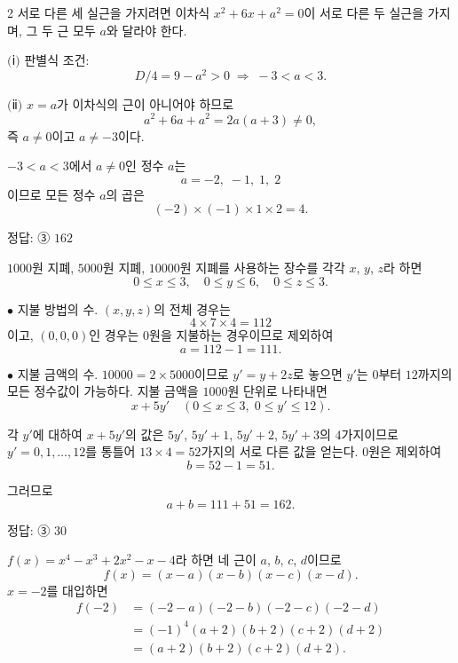 \documentclass[10pt]{article}
\begin{document}
\begin{multicols}{2}
서로 다른 세 실근을 가지려면 이차식 $x^2 + 6x + a^2 = 0$이 서로 다른 두 실근을 가지며, 그 두 근 모두 $a$와 달라야 한다.

$(\!$ⅰ$)$ 판별식 조건:
\[ D/4 = 9 - a^2 > 0 \;\Rightarrow\; -3 < a < 3. \]

$(\!$ⅱ$)$ $x = a$가 이차식의 근이 아니어야 하므로
\[ a^2 + 6a + a^2 = 2a(a+3) \ne 0, \]
즉 $a \ne 0$이고 $a \ne -3$이다.

$-3 < a < 3$에서 $a \ne 0$인 정수 $a$는
\[ a = -2,\; -1,\; 1,\; 2 \]
이므로 모든 정수 $a$의 곱은
\[ (-2) \times (-1) \times 1 \times 2 = 4. \]

\begin{answerbox}정답: ③ $162$\end{answerbox}

$1000$원 지폐, $5000$원 지폐, $10000$원 지폐를 사용하는 장수를 각각 $x$, $y$, $z$라 하면
\[ 0 \le x \le 3,\quad 0 \le y \le 6,\quad 0 \le z \le 3. \]

$\bullet$ 지불 방법의 수. $(x, y, z)$의 전체 경우는
\[ 4 \times 7 \times 4 = 112 \]
이고, $(0, 0, 0)$인 경우는 $0$원을 지불하는 경우이므로 제외하여
\[ a = 112 - 1 = 111. \]

$\bullet$ 지불 금액의 수. $10000 = 2 \times 5000$이므로 $y' = y + 2z$로 놓으면 $y'$는 $0$부터 $12$까지의 모든 정수값이 가능하다. 지불 금액을 $1000$원 단위로 나타내면
\[ x + 5y' \quad (0 \le x \le 3,\; 0 \le y' \le 12). \]

각 $y'$에 대하여 $x + 5y'$의 값은 $5y'$, $5y'+1$, $5y'+2$, $5y'+3$의 $4$가지이므로 $y' = 0, 1, \ldots, 12$를 통틀어 $13 \times 4 = 52$가지의 서로 다른 값을 얻는다. $0$원은 제외하여
\[ b = 52 - 1 = 51. \]

그러므로
\[ a + b = 111 + 51 = 162. \]

\begin{answerbox}정답: ③ $30$\end{answerbox}

$f(x) = x^4 - x^3 + 2x^2 - x - 4$라 하면 네 근이 $a$, $b$, $c$, $d$이므로
\[ f(x) = (x - a)(x - b)(x - c)(x - d). \]
$x = -2$를 대입하면
\begin{align*}
f(-2) &= (-2 - a)(-2 - b)(-2 - c)(-2 - d) \\
&= (-1)^4 (a + 2)(b + 2)(c + 2)(d + 2) \\
&= (a + 2)(b + 2)(c + 2)(d + 2).
\end{align*}


\end{multicols}
\end{document}
